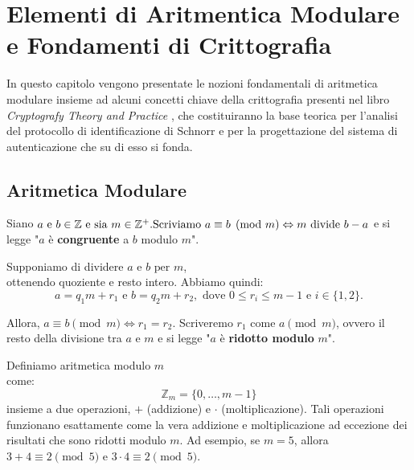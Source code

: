 \chapter{Elementi di Aritmentica Modulare e Fondamenti di Crittografia}

In questo capitolo vengono presentate le nozioni fondamentali di aritmetica modulare insieme ad alcuni concetti chiave della crittografia presenti nel libro \textit{Cryptografy Theory and Practice} \cite{stinson2019cryptography} , che costituiranno la base teorica per l'analisi del protocollo di identificazione di Schnorr e per la progettazione del sistema di autenticazione che su di esso si fonda.

\section{Aritmetica Modulare}

\begin{de}[Congruenza]
	Siano $a \text{ e } b \in \mathbb{Z} \text{ e sia } m \in \mathbb{Z}^+. \\ \text{Scriviamo } a \equiv b \pmod{m} \Leftrightarrow m \text{ divide } b - a$ e si legge "$a$ è \textbf{congruente} a $b$ modulo $m$".
\end{de}

\begin{de}
	Supponiamo di dividere $a \text{ e } b \text{ per } m$, \\ ottenendo quoziente e resto intero. Abbiamo quindi: \\
	$$a = q_1m + r_1 \text{ e } b = q_2m + r_2, \text{ dove } 0 \leq r_i \leq m - 1 \text{ e } i \in \{1, 2\}.$$
	
	Allora, $a \equiv b \pmod{m}\Leftrightarrow r_1 = r_2$. Scriveremo $r_1 \text{ come } a \pmod{m}$, ovvero il resto della divisione tra $a \text{ e } m$ e si legge "$a$ è \textbf{ridotto modulo} $m$".
\end{de}

\begin{de}
	Definiamo aritmetica modulo $m$ \\ come:
	$$\mathbb{Z}_m = \{ 0, \ldots, m - 1 \}$$
	insieme a due operazioni, $+$ (addizione) e $\cdot$ (moltiplicazione). Tali operazioni \\ funzionano esattamente come la vera addizione e moltiplicazione ad eccezione dei risultati che sono ridotti modulo $m$.
	Ad esempio, se $m = 5$, allora $3 + 4 \equiv 2 \pmod{5}$ e $3 \cdot 4 \equiv 2 \pmod{5}$.
\end{de}

